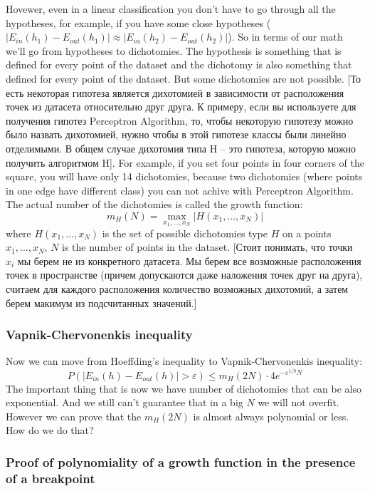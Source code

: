 Hovewer, even in a linear classification you don't have to go through all the hypotheses, for example, if you have some close hypotheses ($|E_{in}(h_1)-E_{out}(h_1)|\approx|E_{in}(h_2)-E_{out}(h_2)|$). So in terms of our math we'll go from hypotheses to dichotomies. The hypothesis is something that is defined for every point of the dataset and the dichotomy is also something that defined for every point of the dataset. But some dichotomies are not possible. [То есть некоторая гипотеза является дихотомией в зависимости от расположения точек из датасета относительно друг друга. К примеру, если вы используете для получения гипотез Perceptron Algorithm, то, чтобы некоторую гипотезу можно было назвать дихотомией, нужно чтобы в этой гипотезе классы были линейно отделимыми. В общем случае дихотомия типа H -- это гипотеза, которую можно получить алгоритмом H]. For example, if you set four points in four corners of the square, you will have only 14 dichotomies, because two dichotomies (where points in one edge have different class) you can not achive with Perceptron Algorithm. The actual number of the dichotomies is called the growth function:
$$m_H(N)=\max\limits_{x_1,\ldots,x_N}|H(x_1,\ldots,x_N)|$$
where $H(x_1,\ldots,x_N)$ is the set of possible dichotomies type $H$ on a points $x_1,\ldots,x_N$, $N$ is the number of points in the dataset. [Стоит понимать, что точки $x_i$ мы берем не из конкретного датасета. Мы берем все возможные расположения точек в пространстве (причем допускаются даже наложения точек друг на друга), считаем для каждого расположения количество возможных дихотомий, а затем берем макимум из подсчитанных значений.]

\subsubsection*{Vapnik-Chervonenkis inequality}

Now we can move from Hoeffding's inequality to Vapnik-Chervonenkis inequality:
$$P(|E_{in}(h)-E_{out}(h)|>\varepsilon)\le m_H(2N)\cdot4e^{-\varepsilon^{1/8}N}$$
The important thing that is now we have number of dichotomies that can be also exponential. And we still can't guarantee that in a big $N$ we will not overfit. However we can prove that the $m_H(2N)$ is almost always polynomial or less. How do we do that? 

\subsubsection*{Proof of polynomiality of a growth function in the presence of a breakpoint}

